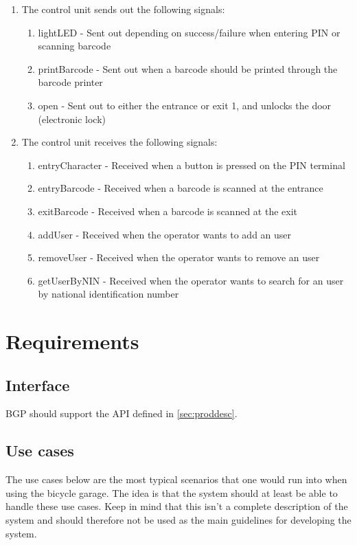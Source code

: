 \documentclass[12pt,titlepage,bibliography=totoc]{article}
\begin{document}
\begin{enumerate}
	\item The control unit sends out the following signals:
	\begin{enumerate}
		\item lightLED - Sent out depending on success/failure when entering PIN or scanning barcode
		\item printBarcode - Sent out when a barcode should be printed through the barcode printer
		\item open - Sent out to either the entrance or exit 1, and unlocks the door (electronic lock)
	\end{enumerate}
	\item The control unit receives the following signals:
	\begin{enumerate}
		\item entryCharacter - Received when a button is pressed on the PIN terminal
		\item entryBarcode - Received when a barcode is scanned at the entrance
		\item exitBarcode - Received when a barcode is scanned at the exit
		\item addUser - Received when the operator wants to add an user
		\item removeUser - Received when the operator wants to remove an user
		\item getUserByNIN - Received when the operator wants to search for an user by national identification number
	\end{enumerate}
\end{enumerate}

\section{Requirements}
\subsection{Interface}
BGP should support the API defined in \cref{sec:proddesc}.
\subsection{Use cases}
\label{sec:cases}
The use cases below are the most typical scenarios that one would run into when using the bicycle garage. The idea is that the system should at least be able to handle these use cases. Keep in mind that this isn't a complete description of the system and should therefore not be used as the main guidelines for developing the system.
\end{document}
